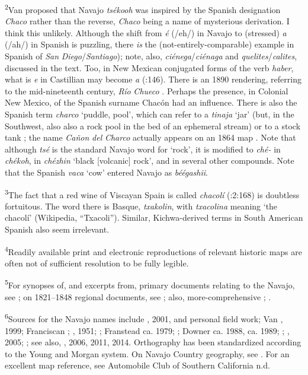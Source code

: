 \textsuperscript{2}Van \citet[19]{Valkenburgh1999} proposed that Navajo \textit{tsékooh} was inspired by the Spanish designation \textit{Chaco} rather than the reverse, \textit{Chaco} being a name of mysterious derivation.  I think this unlikely.  Although the shift from \textit{é} (/eh/) in Navajo to (stressed) \textit{a} (/ah/) in Spanish is puzzling, there \textit{is} the (not-entirely-comparable) example in Spanish of \textit{San} \textit{Diego}/\textit{Santiago}); note, also, \textit{ciénega}/\textit{ciénaga} and \textit{quelites}/\textit{calites}, discussed in the text.  Too, in New Mexican conjugated forms of the verb \textit{haber}, what is \textit{e} in Castillian may become \textit{a} (\citealt{BillsVigil2008}:146).  There is an 1890 rendering, referring to the mid-nineteenth century, \textit{Río} \textit{Chueco} \citep[228]{Conrad1890}.  Perhaps the presence, in Colonial New Mexico, of the Spanish surname Chacón had an influence.  There is also the Spanish term \textit{charco} ‘puddle, pool’, which can refer to a \textit{tinaja} ‘jar’ (but, in the Southwest, also also a rock pool in the bed of an ephemeral stream) or to a stock tank \citep[224]{Cobos1983}; the name \textit{Cañon} \textit{del} \textit{Charco} actually appears on an 1864 map \citep[120]{Eidenbach2012}.  Note that although \textit{tsé} is the standard Navajo word for ‘rock’, it is modified to \textit{ché-} in \textit{chékoh}, in \textit{chézhin} ‘black [volcanic] rock’, and in several other compounds.  Note that the Spanish \textit{vaca} ‘cow’ entered Navajo as \textit{béégashii}.

\textsuperscript{3}The fact that a red wine of Viscayan Spain is called \textit{chacolí} (\citealt{Williams1955}:2:168) is doubtless fortuitous.  The word there is Basque, \textit{txakolin}, with \textit{txacolina} meaning ‘the chacolí’ (Wikipedia, “Txacoli”).  Similar, Kichwa-derived terms in South American Spanish also seem irrelevant.

\textsuperscript{4}Readily available print and electronic reproductions of relevant historic maps are often not of sufficient resolution to be fully legible.

\textsuperscript{5}For synopses of, and excerpts from, primary documents relating to the Navajo, see \citealt{Correll1979}; on 1821–1848 regional documents, see \citealt{Tyler1984}; also, more-comprehensive \citealt{Twitchell1976}; \citealt{Beers1979}.

\textsuperscript{6}Sources for the Navajo names include \citealt{Jett1970}, 2001, and personal field work; Van \citealt{Valkenburgh1974}, 1999; Franciscan \citealt{Fathers1910}; \citealt{Haile1950}, 1951; \citealt{Pearce1965}; Franstead ca. 1979; \citealt{YoungMorgan1980}; Downer ca. 1988, ca. 1989; \citealt{WilsonDennison1995}; \citealt{Linford2000}, 2005; \citealt{Bright2013}; see also, \citealt{Jett1997}, 2006, 2011, 2014.  Orthography has been standardized according to the Young and Morgan system.  On Navajo Country geography, see \citealt{Goodman1982}.  For an excellent map reference, see Automobile Club of Southern California n.d.

